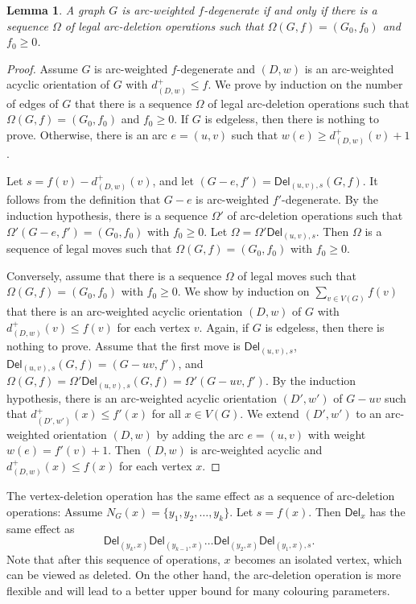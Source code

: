 \documentclass[11pt,a4paper]{article}
\newtheorem{lem}{Lemma}
\theoremstyle{definition}
\newcommand{\dd}{\textsf{Del}}
\newcommand{\ed}{\textsf{Del}}
\begin{document}
\begin{lem}
    \label{lem-alternate}
    A graph $G$ is arc-weighted $f$-degenerate if and only if there is a sequence $\Omega$ of legal arc-deletion operations such that $\Omega(G,f)=(G_0,f_0)$ and $f_0 \ge 0$.  
\end{lem}
\begin{proof}
     Assume $G$ is arc-weighted $f$-degenerate and $(D,w)$ is an arc-weighted  acyclic orientation of $G$ with $d_{(D,w)}^+  \le f$. 
     We prove by induction on the number of edges of $G$ that  there is a sequence $\Omega$ of legal arc-deletion operations such that $\Omega(G,f)=(G_0,f_0)$ and $f_0 \ge 0$.   
     If $G$ is edgeless, then there is nothing to prove. Otherwise, there is an arc $e=(u,v)$ such that $w(e) \ge d_{(D,w)}^+(v)+1$.  
     
        Let $s = f(v) - d_{(D,w)}^+(v)$, and let $(G-e,f')=\ed_{(u,v),s}(G,f)$.  
      It follows from the definition that $G-e$ is  arc-weighted $f'$-degenerate. 
     By the induction hypothesis, there is a sequence $\Omega'$ of arc-deletion operations  such that $\Omega'(G-e, f') = (G_0,f_0)$ with $f_0 \ge 0$. Let $\Omega = \Omega' \ed_{(u,v),s}$.   Then $\Omega$ is a sequence of legal moves such that $\Omega(G, f) = (G_0,f_0)$ with $f_0 \ge 0$.

 Conversely, assume that there is a sequence $\Omega$ of legal moves such that $\Omega(G,f) = (G_0,f_0)$ with $f_0 \ge 0$. 
     We show by induction on $\sum_{v \in V(G)}f(v)$ that there is an arc-weighted  acyclic orientation $(D,w)$ of $G$ with 
    $d_{(D,w)}^+(v) \le f(v)$ for each vertex $v$. Again, if $G$ is edgeless,   then there is nothing to prove. Assume that the first move is  $\ed_{(u,v), s}$, $\ed_{(u,v), s}(G, f) = (G-uv, f')$, and $\Omega (G, f)= \Omega' \ed_{(u,v), s} (G, f) = \Omega'(G-uv, f')$.
 By the induction hypothesis, 
    there is an arc-weighted acyclic orientation $(D',w')$ of $G-uv$ such that 
    $d_{(D',w')}^+(x) \le f'(x)$ for all $x \in V(G)$. We extend $(D',w')$ to an arc-weighted orientation $(D,w)$ by adding the arc $e=(u,v)$ with weight $w(e) = f'(v)+1$. Then $(D,w)$ is  arc-weighted acyclic  and $d^+_{(D,w)}(x)   \le f(x)$ for each vertex $x$. 
\end{proof}


The vertex-deletion operation has the same effect as a  sequence of arc-deletion operations: Assume $N_G(x)=\{y_1,y_2, \ldots, y_k\}$. Let $s= f(x)$.  Then $\dd_x$ has the same effect as 
$$\ed_{(y_k,x)}\ed_{(y_{k-1},x)} \ldots \ed_{(y_2,x)} \ed_{(y_1,x), s}.$$ 
Note that after this sequence of operations, $x$ becomes an isolated vertex, which can be viewed as deleted.
On the other hand, the arc-deletion operation is more flexible and will lead to a better upper bound for many colouring parameters. 
\end{document}
